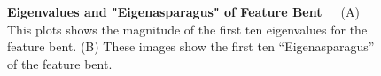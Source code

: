 \begin{figure}
    \centering
    \qquad
    \caption[First ten Eigenvalues and "Eigenasparagus" of Feature Bent]{\textbf{Eigenvalues and "Eigenasparagus" of Feature Bent}~~~(A) This plots shows the magnitude of the first ten eigenvalues for the feature bent. (B) These images show the first ten “Eigenasparagus” of the feature bent.}
    \label{fig:PCAbent}
\end{figure}

